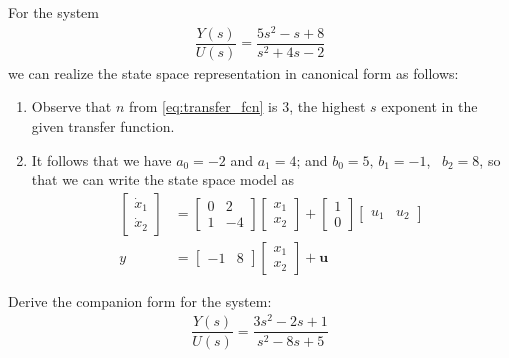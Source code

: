 \begin{example}
	For the system 
	\begin{align}
		\dfrac{Y(s)}{U(s)} = \dfrac{5s^2-s+8}{s^2+4s-2}
	\end{align}
	we can realize the state space representation in canonical form as follows:
	\begin{enumerate}
		\item Observe that $n$ from \eqref{eq:transfer_fcn} is $3$, \ie the highest $s$ exponent in the given transfer function. 
		\item It follows that we have $a_0= -2$ and $a_1 = 4$; and $b_0 = 5, \, b_1=-1$, \, $b_2 = 8$, so that we can write the state space model as
		\begin{align}
			  \begin{bmatrix}
			  \dot{x}_1 
			  \\
			  \dot{x}_2
			  \end{bmatrix} 
			  &=
			  \begin{bmatrix}
			  0 & 2  \\
			  1 & -4 
			  \end{bmatrix}
			  \begin{bmatrix}
			  {x}_1 
			  \\
			  {x}_2
			  \end{bmatrix} 
			  +
			  \begin{bmatrix}
			  1
			  \\
			  0
			  \end{bmatrix} 			  
			  \begin{bmatrix}
			  {u}_1 
			  &
			  {u}_2
			  \end{bmatrix} \nonumber \\
			  y &= \begin{bmatrix}
			  -1 & 8
			  \end{bmatrix}
			  \begin{bmatrix}
			  {x}_1 
			  \\
			  {x}_2
			  \end{bmatrix} 
			  + 
			  \bm{u}
		\end{align}
	\end{enumerate}
\end{example}
%
\begin{homework}
	Derive the companion form for the system:
	\begin{align}
	\dfrac{Y(s)}{U(s)} = \dfrac{3s^2-2s+1}{s^2-8s+5}
	\end{align}
	\label{eq:companion_ex}
\end{homework}

